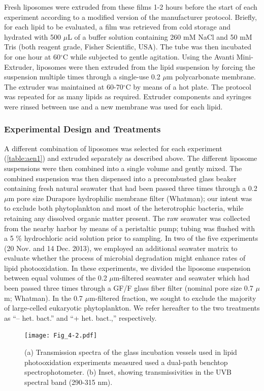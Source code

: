 Fresh liposomes were extruded from these films 1-2 hours before the start of each experiment according to a modified version of the manufacturer protocol. Briefly, for each lipid to be evaluated, a film was retrieved from cold storage and hydrated with 500 $\mu$L of a buffer solution containing 260 mM NaCl and 50 mM Tris (both reagent grade, Fisher Scientific, USA). The tube was then incubated for one hour at 60$^{\circ}$C while subjected to gentle agitation. Using the Avanti Mini-Extruder, liposomes were then extruded from the lipid suspension by forcing the suspension multiple times through a single-use 0.2 $\mu$m polycarbonate membrane. The extruder was maintained at 60-70$^{\circ}$C by means of a hot plate. The protocol was repeated for as many lipids as required. Extruder components and syringes were rinsed between use and a new membrane was used for each lipid.

\subsubsection{Experimental Design and Treatments}

A different combination of liposomes was selected for each experiment (\autoref{table:aen1}) and extruded separately as described above. The different liposome suspensions were then combined into a single volume and gently mixed. The combined suspension was then dispensed into a precombusted glass beaker containing fresh natural seawater that had been passed three times through a 0.2 $\mu$m pore size Durapore hydrophilic membrane filter (Whatman); our intent was to exclude both phytoplankton and most of the heterotrophic bacteria, while retaining any dissolved organic matter present. The raw seawater was collected from the nearby harbor by means of a peristaltic pump; tubing was flushed with a 5 \% hydrochloric acid solution prior to sampling. In two of the five experiments (20 Nov. and 14 Dec. 2013), we employed an additional seawater matrix to evaluate whether the process of microbial degradation might enhance rates of lipid photooxidation. In these experiments, we divided the liposome suspension between equal volumes of the 0.2 $\mu$m-filtered seawater and seawater which had been passed three times through a GF/F glass fiber filter (nominal pore size 0.7 $\mu$m; Whatman). In the 0.7 $\mu$m-filtered fraction, we sought to exclude the majority of large-celled eukaryotic phytoplankton. We refer hereafter to the two treatments as ``-- het. bact.'' and ``+ het. bact.,'' respectively.\begin{figure}
\centering
\texttt{[image: Fig\_4-2.pdf]}
\caption[Transmission spectra of glass incubation vessels used in lipid photooxidation experiments]{(a) Transmission spectra of the glass incubation vessels used in lipid photooxidation experiments measured used a dual-path benchtop spectrophotometer. (b) Inset, showing transmissivities in the UVB spectral band (290-315 nm).}
\label{fig:c4n2}
\end{figure}

